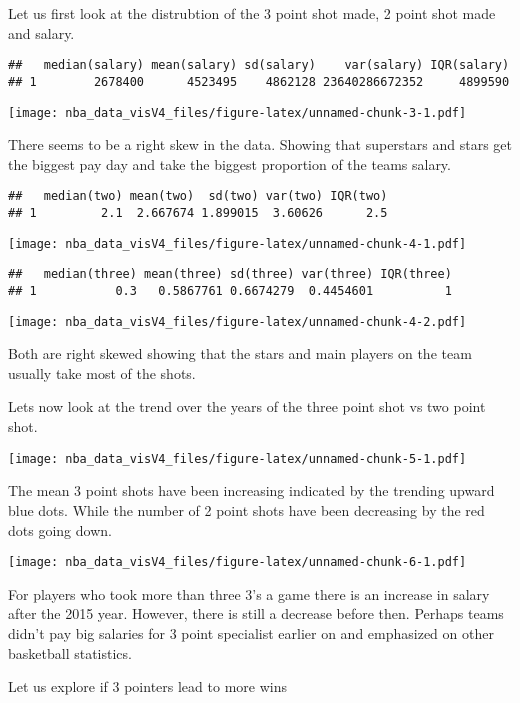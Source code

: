 \documentclass[]{article}
\begin{document}
Let us first look at the distrubtion of the 3 point shot made, 2 point
shot made and salary.

\begin{verbatim}
##   median(salary) mean(salary) sd(salary)    var(salary) IQR(salary)
## 1        2678400      4523495    4862128 23640286672352     4899590
\end{verbatim}

\texttt{[image: nba\_data\_visV4\_files/figure-latex/unnamed-chunk-3-1.pdf]}

There seems to be a right skew in the data. Showing that superstars and
stars get the biggest pay day and take the biggest proportion of the
teams salary.

\begin{verbatim}
##   median(two) mean(two)  sd(two) var(two) IQR(two)
## 1         2.1  2.667674 1.899015  3.60626      2.5
\end{verbatim}

\texttt{[image: nba\_data\_visV4\_files/figure-latex/unnamed-chunk-4-1.pdf]}

\begin{verbatim}
##   median(three) mean(three) sd(three) var(three) IQR(three)
## 1           0.3   0.5867761 0.6674279  0.4454601          1
\end{verbatim}

\texttt{[image: nba\_data\_visV4\_files/figure-latex/unnamed-chunk-4-2.pdf]}

Both are right skewed showing that the stars and main players on the
team usually take most of the shots.

Lets now look at the trend over the years of the three point shot vs two
point shot.

\texttt{[image: nba\_data\_visV4\_files/figure-latex/unnamed-chunk-5-1.pdf]}

The mean 3 point shots have been increasing indicated by the trending
upward blue dots. While the number of 2 point shots have been decreasing
by the red dots going down.

\texttt{[image: nba\_data\_visV4\_files/figure-latex/unnamed-chunk-6-1.pdf]}

For players who took more than three 3's a game there is an increase in
salary after the 2015 year. However, there is still a decrease before
then. Perhaps teams didn't pay big salaries for 3 point specialist
earlier on and emphasized on other basketball statistics.

Let us explore if 3 pointers lead to more wins
\end{document}
